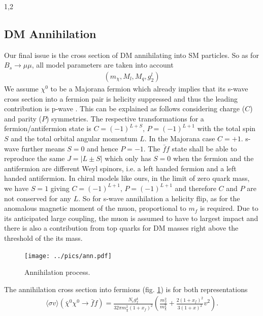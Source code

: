 \documentclass[11pt,a4paper,twoside]{article}
\numberwithin{equation}{section}
\begin{document}
\begin{spacing}{1,2}
\subsection{DM Annihilation}
Our final issue is the cross section of DM annihilating into SM particles. So as for $B_s\rightarrow \mu\mu$, all model parameters are taken into
account
\begin{align}
 \left(m_\chi, M_l, M_q, g^l_2\right)
\end{align}
We assume $\chi^0$ to be a Majorana fermion which already implies that its s-wave cross section into a fermion pair is helicity suppressed and 
thus the leading contribution is p-wave \cite{1307.8120}. This can be explained as follows considering charge ($C$) and parity ($P$) symmetries.
The respective transformations for a fermion/antifermion state is $C=(-1)^{L+S},\,P=(-1)^{L+1}$ with the total spin $S$ and the total orbital angular
momentum $L$. 
In the Majorana case $C=+1$. s-wave further means $S=0$ and hence $P=-1$. The $\bar f f$ state shall be able to reproduce the same $J=|L\pm S|$ 
which only has $S=0$ when the fermion and the antifermion are different Weyl spinors, i.e. a left handed fermion and a left handed antifermion.
In chiral models like ours, in the limit of zero quark mass, we have $S=1$ giving $C=(-1)^{L+1},\,P=(-1)^{L+1}$ and therefore $C$ and $P$ are not 
conserved for any $L$. So for s-wave annihilation a helicity flip, as for the anomalous magnetic moment of the muon, proportional to $m_f$ is 
required. Due to its anticipated large coupling, the muon is assumed to have to largest impact and there is also a contribution from top quarks
for DM masses right above the threshold of the its mass. 
\begin{figure}[t]
 \texttt{[image: ../pics/ann.pdf]}
 \caption{Annihilation process.}
 \label{pic_annihilation}
\end{figure}
The annihilation cross section into fermions (fig. \ref{pic_annihilation}) is for both representations \cite{1503.01500}
\begin{align}
 \langle \sigma v \rangle \left(\bar \chi^0 \chi^0 \rightarrow \bar f f\right) = \frac{N_c g_f^4}{32\pi m_\chi^2\left(1+x_f\right)^2} \left(\frac{m_f^2}{m_\chi^2} + \frac{2\left(1+x_f\right)^2}{3\left(1+x\right)^2} v^2\right)  .

\end{align}
\end{spacing}
\end{document}
